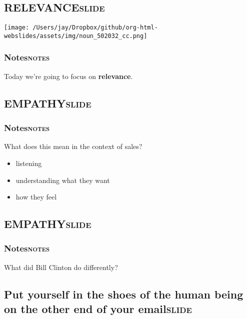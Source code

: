 \documentclass[11pt]{article}
\begin{document}
\subsection{\textbf{RELEVANCE}\hfill{}\textsc{slide}}
\label{sec:org2d6343b}
\begin{center}
\texttt{[image: /Users/jay/Dropbox/github/org-html-webslides/assets/img/noun\_502032\_cc.png]}
\end{center}

\subsubsection{Notes\hfill{}\textsc{notes}}
\label{sec:orgf7a9f89}

Today we're going to focus on \textbf{relevance}.

\subsection{\textbf{EMPATHY}\hfill{}\textsc{slide}}
\label{sec:orgd6eef15}

\subsubsection{Notes\hfill{}\textsc{notes}}
\label{sec:org847cd0c}
What does this mean in the context of sales?

\begin{itemize}
\item listening
\item understanding what they want
\item how they feel
\end{itemize}

\subsection{\textbf{EMPATHY}\hfill{}\textsc{slide}}
\label{sec:orgdc2192a}



\subsubsection{Notes\hfill{}\textsc{notes}}
\label{sec:orgbb8e5a1}
What did Bill Clinton do differently?

\subsection{Put yourself in the shoes of the human being on the other end of your email\hfill{}\textsc{slide}}
\label{sec:orga0b0a7c}
\end{document}
